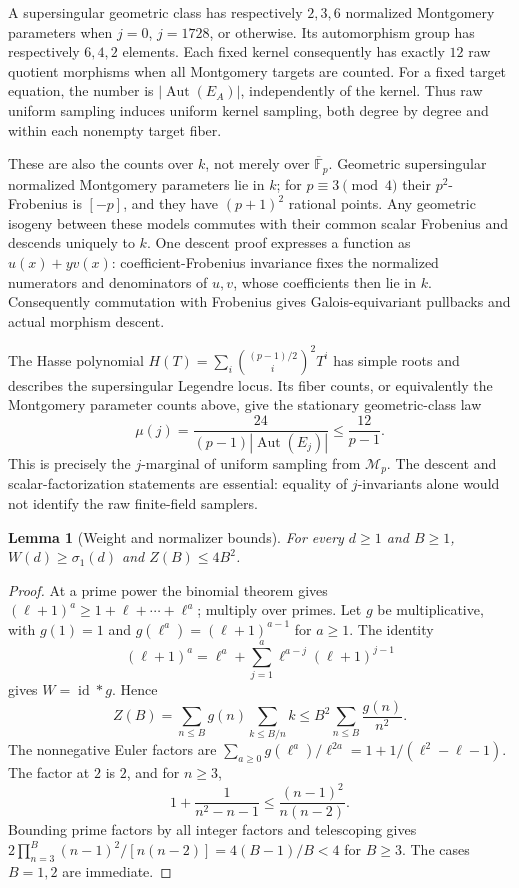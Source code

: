 \documentclass[11pt]{article}
\newtheorem{lemma}{Lemma}
\newcommand{\F}{\mathbb F}
\newcommand{\Aut}{\operatorname{Aut}}
\newcommand{\id}{\operatorname{id}}
\begin{document}
A supersingular geometric class has respectively $2,3,6$ normalized Montgomery
parameters when $j=0$, $j=1728$, or otherwise. Its automorphism group has
respectively $6,4,2$ elements. Each fixed kernel consequently has exactly $12$
raw quotient morphisms when all Montgomery targets are counted. For a fixed
target equation, the number is $|\Aut(E_A)|$, independently of the kernel.
Thus raw uniform sampling induces uniform kernel sampling, both degree by degree
and within each nonempty target fiber.

These are also the counts over $k$, not merely over $\overline{\F}_p$.
Geometric supersingular normalized Montgomery parameters lie in $k$; for
$p\equiv3\pmod4$ their $p^2$-Frobenius is $[-p]$, and they have $(p+1)^2$ rational
points. Any geometric isogeny between these models commutes with their common
scalar Frobenius and descends uniquely to $k$. One descent proof expresses a
function as $u(x)+yv(x)$: coefficient-Frobenius invariance fixes the normalized
numerators and denominators of $u,v$, whose coefficients then lie in $k$.
Consequently commutation with Frobenius gives Galois-equivariant pullbacks and
actual morphism descent.

The Hasse polynomial $H(T)=\sum_i\binom{(p-1)/2}{i}^{\!2}T^i$ has simple roots
and describes the supersingular Legendre locus. Its fiber counts, or equivalently
the Montgomery parameter counts above, give the stationary geometric-class law
\begin{equation}\label{eq:stationary}
 \mu(j)=\frac{24}{(p-1)|\Aut(E_j)|}\le\frac{12}{p-1}.
\end{equation}
This is precisely the $j$-marginal of uniform sampling from $\mathcal M_p$.
The descent and scalar-factorization statements are essential: equality of
$j$-invariants alone would not identify the raw finite-field samplers.

\begin{lemma}[Weight and normalizer bounds]\label{lem:weight}
For every $d\ge1$ and $B\ge1$,
$W(d)\ge\sigma_1(d)$ and $Z(B)\le4B^2$.
\end{lemma}
\begin{proof}
At a prime power the binomial theorem gives
$(\ell+1)^a\ge1+\ell+\cdots+\ell^a$; multiply over primes.
Let $g$ be multiplicative, with $g(1)=1$ and $g(\ell^a)=(\ell+1)^{a-1}$ for
$a\ge1$. The identity
\[
 (\ell+1)^a=\ell^a+\sum_{j=1}^a\ell^{a-j}(\ell+1)^{j-1}
\]
gives $W=\id*g$. Hence
\[
 Z(B)=\sum_{n\le B}g(n)\sum_{k\le B/n}k
 \le B^2\sum_{n\le B}\frac{g(n)}{n^2}.
\]
The nonnegative Euler factors are
$\sum_{a\ge0}g(\ell^a)/\ell^{2a}=1+1/(\ell^2-\ell-1)$.
The factor at $2$ is $2$, and for $n\ge3$,
\[
 1+\frac1{n^2-n-1}\le\frac{(n-1)^2}{n(n-2)}.
\]
Bounding prime factors by all integer factors and telescoping gives
$2\prod_{n=3}^B (n-1)^2/[n(n-2)]=4(B-1)/B<4$ for $B\ge3$.
The cases $B=1,2$ are immediate.
\end{proof}
\end{document}
